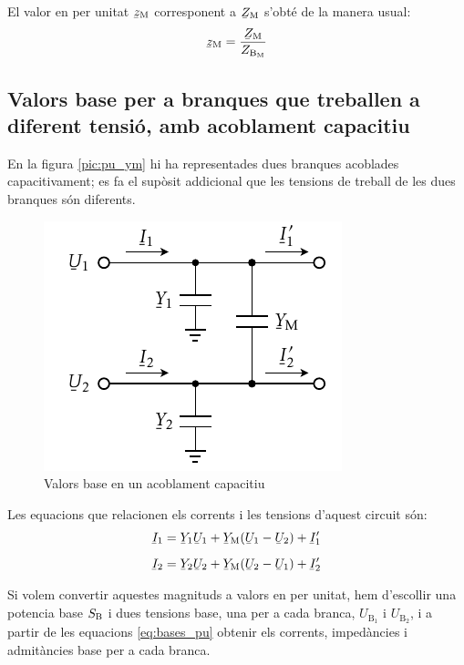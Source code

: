 El valor en per unitat $\cmplx{z}\ped{M}$ corresponent a $\cmplx{Z}\ped{M}$ s'obt\'{e} de la manera usual:
\begin{equation}
    \cmplx{z}\ped{M} = \frac{\cmplx{Z}\ped{M}}{Z_{\text{B}_\text{M}}}
\end{equation}


\subsection{Valors base per a branques que treballen a diferent tensi\'{o}, amb acoblament capacitiu}

En la figura \vref{pic:pu_ym} hi ha representades dues branques acoblades capacitivament; es fa el sup\`{o}sit addicional que les tensions de treball de les dues branques s\'{o}n diferents.
\begin{figure}[h]
\centering
    \includegraphics{Imatges/Cap-Fonaments-pu-YM.pdf}
    \caption{Valors base en un acoblament capacitiu} \label{pic:pu_ym}
\end{figure}

Les equacions que relacionen els corrents i les tensions d'aquest circuit s\'{o}n:
\begin{subequations}
\begin{align}
    \cmplx{I}_1  &= \cmplx{Y}_1 \cmplx{U}_1 +  \cmplx{Y}\ped{M}(\cmplx{U}_1-\cmplx{U}_2)  + \cmplx{I}'_1   \\[2mm]
    \cmplx{I}_2  &= \cmplx{Y}_2 \cmplx{U}_2 +  \cmplx{Y}\ped{M}(\cmplx{U}_2-\cmplx{U}_1)  + \cmplx{I}'_2
\end{align}
\end{subequations}

Si volem convertir aquestes magnituds a valors en per unitat, hem d'escollir  una potencia base $S_\mathrm{B}$ i dues tensions base, una  per a cada branca, $U_{\text{B}_1}$ i  $U_{\text{B}_2}$, i a partir de les equacions \eqref{eq:bases_pu} obtenir els corrents, imped\`{a}ncies i admit\`{a}ncies base per a cada branca.

